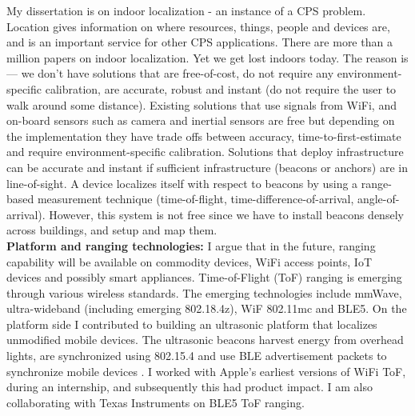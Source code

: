 \documentclass[10pt]{article}
\begin{document}
My dissertation is on indoor localization - an instance of a CPS problem. Location gives information on where resources, things, people and devices are, and is an important service for other CPS applications. There are more than a million papers on indoor localization. Yet we get lost indoors today. The reason is --- we don't have solutions that are free-of-cost, do not require any environment-specific calibration, are accurate, robust and instant (do not require the user to walk around some distance). Existing solutions that use signals from WiFi, and on-board sensors such as camera and inertial sensors are free but depending on the implementation they have trade offs between accuracy, time-to-first-estimate and require environment-specific calibration. Solutions that deploy infrastructure can be accurate and instant if sufficient infrastructure (beacons or anchors) are in line-of-sight. A device localizes itself with respect to beacons by using a range-based measurement technique (time-of-flight, time-difference-of-arrival, angle-of-arrival). However, this system is not free since we have to install beacons densely across buildings, and setup and map them. \\



\textbf{Platform and ranging technologies:} I argue that in the future, ranging capability will be available on commodity devices, WiFi access points, IoT devices and possibly smart appliances. %
Time-of-Flight (ToF) ranging is emerging through various wireless standards. %
The emerging technologies include mmWave, ultra-wideband (including emerging 802.18.4z), WiF 802.11mc and BLE5. On the platform side I contributed to building an ultrasonic platform that localizes unmodified mobile devices. The ultrasonic beacons harvest energy from overhead lights, are synchronized using 802.15.4 and use BLE advertisement packets to synchronize mobile devices
\cite{rtas-alps-platform, lazik2015alps,lazik2015alpsdemo}. I worked with Apple's earliest versions of WiFi ToF, during an internship, and subsequently this had product impact. I am also collaborating with Texas Instruments on BLE5 ToF ranging. 
\end{document}

